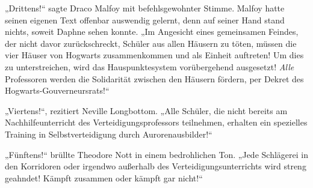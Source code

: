 „Drittens!“ sagte Draco Malfoy mit befehlsgewohnter Stimme. Malfoy hatte seinen eigenen Text offenbar auswendig gelernt, denn auf seiner Hand stand nichts, soweit Daphne sehen konnte.
„Im Angesicht eines gemeinsamen Feindes, der nicht davor zurückschreckt, Schüler aus allen Häusern zu töten, müssen die vier Häuser von Hogwarts zusammenkommen und als Einheit auftreten! Um dies zu unterstreichen, wird das Hauspunktesystem vorübergehend ausgesetzt! \emph{Alle} Professoren werden die Solidarität zwischen den Häusern fördern, per Dekret des Hogwarts-Gouverneursrats!“

„Viertens!“, rezitiert Neville Longbottom.
„Alle Schüler, die nicht bereits am Nachhilfeunterricht des Verteidigungsprofessors teilnehmen, erhalten ein spezielles Training in Selbstverteidigung durch Aurorenausbilder!“

„Fünftens!“ brüllte Theodore Nott in einem bedrohlichen Ton.
„Jede Schlägerei in den Korridoren oder irgendwo außerhalb des Verteidigungsunterrichts wird streng geahndet! Kämpft zusammen oder kämpft gar nicht!“

